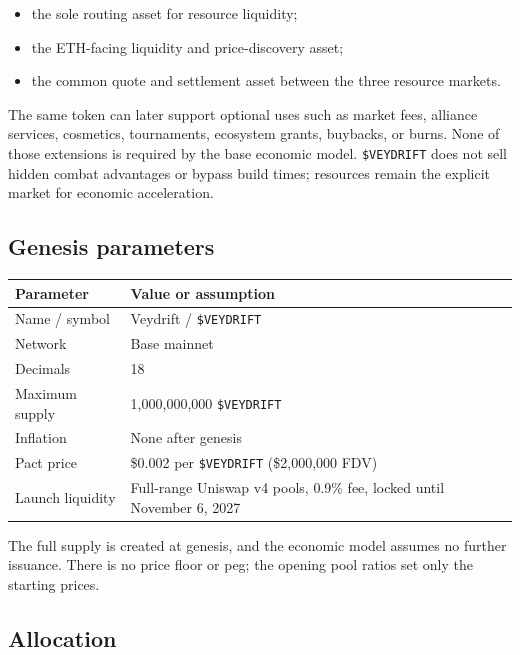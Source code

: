 \documentclass[11pt]{article}
\newcommand{\token}[1]{\texttt{\$#1}}
\begin{document}
\begin{itemize}
  \item the sole routing asset for resource liquidity;
  \item the ETH-facing liquidity and price-discovery asset;
  \item the common quote and settlement asset between the three resource markets.
\end{itemize}

The same token can later support optional uses such as market fees, alliance services, cosmetics, tournaments, ecosystem grants, buybacks, or burns. None of those extensions is required by the base economic model. \token{VEYDRIFT} does not sell hidden combat advantages or bypass build times; resources remain the explicit market for economic acceleration.

\subsection{Genesis parameters}

\begin{tabularx}{\textwidth}{@{}p{}X@{}}
\toprule
\textbf{Parameter} & \textbf{Value or assumption} \\
\midrule
Name / symbol & Veydrift / \token{VEYDRIFT} \\
Network & Base mainnet \\
Decimals & 18 \\
Maximum supply & 1,000,000,000 \token{VEYDRIFT} \\
Inflation & None after genesis \\
Pact price & \$0.002 per \token{VEYDRIFT} (\$2,000,000 FDV) \\
Launch liquidity & Full-range Uniswap v4 pools, 0.9\% fee, locked until November 6, 2027 \\
\bottomrule
\end{tabularx}

The full supply is created at genesis, and the economic model assumes no further issuance. There is no price floor or peg; the opening pool ratios set only the starting prices.

\subsection{Allocation}
\end{document}
